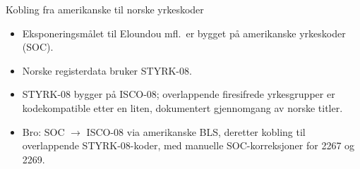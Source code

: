 
\begin{frame}{Kobling fra amerikanske til norske yrkeskoder}
\begin{itemize}\setlength{\itemsep}{8pt}
  \item Eksponeringsmålet til Eloundou mfl.\ er bygget på amerikanske yrkeskoder (SOC).
  \item Norske registerdata bruker STYRK-08.
  \item STYRK-08 bygger på ISCO-08; overlappende firesifrede yrkesgrupper er kodekompatible etter en liten, dokumentert gjennomgang av norske titler.
  \item Bro: SOC $\to$ ISCO-08 via amerikanske BLS, deretter kobling til overlappende STYRK-08-koder, med manuelle SOC-korreksjoner for 2267 og 2269.
\end{itemize}
\end{frame}





